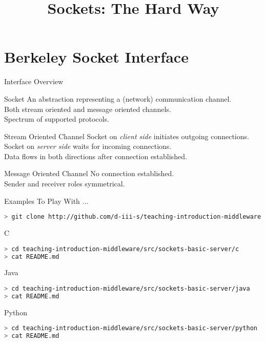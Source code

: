 \RequirePackage{slides-shared}
\title{Sockets: The Hard Way}



\makepreamble

\section{Berkeley Socket Interface}


\begin{frame}{Interface Overview}
    \begin{block}{Socket}
        An abstraction representing a (network) communication channel. \\
        Both stream oriented and message oriented channels. \\
        Spectrum of supported protocols. \\
    \end{block}

    \begin{block}{Stream Oriented Channel}
        Socket on \emph{client side} initiates outgoing connections. \\
        Socket on \emph{server side} waits for incoming connections. \\
        Data flows in both directions after connection established. \\
    \end{block}

    \begin{block}{Message Oriented Channel}
        No connection established. \\
        Sender and receiver roles symmetrical. \\
    \end{block}
\end{frame}


\begin{frame}[fragile]{Examples To Play With ...}
\begin{lstlisting}[language=bash,style=mini]
> git clone http://github.com/d-iii-s/teaching-introduction-middleware.git
\end{lstlisting}
    \begin{block}{C}
\begin{lstlisting}[language=bash,style=mini]
> cd teaching-introduction-middleware/src/sockets-basic-server/c
> cat README.md
\end{lstlisting}
    \end{block}
    \begin{block}{Java}
\begin{lstlisting}[language=bash,style=mini]
> cd teaching-introduction-middleware/src/sockets-basic-server/java
> cat README.md
\end{lstlisting}
    \end{block}
    \begin{block}{Python}
\begin{lstlisting}[language=bash,style=mini]
> cd teaching-introduction-middleware/src/sockets-basic-server/python
> cat README.md
\end{lstlisting}
    \end{block}
\end{frame}


